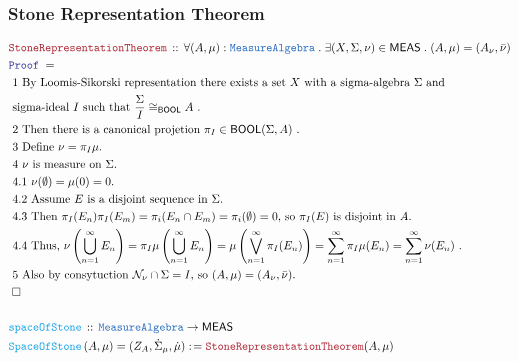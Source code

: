 \documentclass[12pt]{scrartcl}
\newcommand{\TYPE}[1]{\textcolor{NavyBlue}{\mathtt{#1}}}
\newcommand{\FUNC}[1]{\textcolor{Cerulean}{\mathtt{#1}}}
\newcommand{\LOGIC}[1]{\textcolor{Blue}{\mathtt{#1}}}
\newcommand{\THM}[1]{\textcolor{Maroon}{\mathtt{#1}}}
\renewcommand{\.}{\; . \;}
\newcommand{\de}{: \kern 0.1pc =}
\newcommand{\Act}[1]{\left( #1 \right)}
\newcommand{\Theorem}[2]{& \THM{#1} \, :: \, #2 \\ & \Proof = \\ }
\newcommand{\DeclareFunc}[2]{& \FUNC{#1} \, :: \, #2 \\}
\newcommand{\DefineNamedFunc}[4]{&  \FUNC{#1}\Act{#2} = #3 \de #4 \\}
\newcommand{\Page}[1]{ \begin{align*} #1 \end{align*}   }
\newcommand{\QED}{\; \square}
\newcommand{\EndProof}{& \QED \\}
\newcommand{\Proof}{\LOGIC{Proof} \; }
\newcommand{\Explain}[1]{& \text{#1.} \\}
\newcommand{\ExplainFurther}[1]{& \text{#1} \\}
\newcommand{\BOOL}{\mathsf{BOOL}}
\newcommand{\Null}{\mathcal{N}}
\newcommand{\MEAS}{\mathsf{MEAS}}
\newcommand{\MA}{\TYPE{MeasureAlgebra}}
\begin{document}
\subsubsection{Stone Representation Theorem}
\Page{
	\Theorem{StoneRepresentationTheorem}
	{
		\forall (A,\mu) : \MA \. \exists (X,\Sigma,\nu) \in \MEAS \. (A,\mu) = (A_\nu,\bar \nu)
	}
	\ExplainFurther{
		1 By Loomis-Sikorski representation there exists a set $X$ with a sigma-algebra $\Sigma$ and}
	\Explain{ 	sigma-ideal $I$ such that $\frac{\Sigma}{I} \cong_\BOOL  A$
	}
	\Explain{ 2
		Then there is a canonical projetion $\pi_I \in \BOOL(\Sigma,A)$	
	}
	\Explain{ 3 Define $\nu = \pi_I \mu$}
	\Explain{ 4 $\nu$ is measure on $\Sigma$}
	\Explain{ 4.1 $\nu(\emptyset) = \mu(0) = 0$}
	\Explain{ 4.2 Assume $E$ is a disjoint sequence in $\Sigma$}
	\Explain{ 4.3 Then $\pi_I(E_n)\pi_I(E_m) = \pi_i(E_n \cap E_m) = \pi_i(\emptyset) =  0$,
	 so $\pi_I(E)$ is disjoint in $A$}
	\Explain{ 4.4 Thus, 
		$\nu\left( \bigcup^\infty_{n=1} E_n \right) = 
		\pi_I\mu\left( \bigcup^\infty_{n=1} E_n \right) =  
		\mu\left( \bigvee^\infty_{n=1} \pi_I(E_n)\right) =
		\sum^\infty_{n=1} \pi_I\mu(E_n) = 
		\sum^\infty_{n=1} \nu(E_n) $ }
	\Explain{ 5 Also by consytuction $ \Null_\nu \cap \Sigma = I$, so $ (A,\mu) = (A_\nu,\bar \nu)$} 
	\EndProof
	\\
	\DeclareFunc{spaceOfStone}{\MA \to \MEAS}
	\DefineNamedFunc{SpaceOfStone}{A,\mu}{(Z_A,\dot \Sigma_\mu,\dot \mu)}
	{
			\THM{StoneRepresentationTheorem}(A,\mu)	
	}
}
\newpage
\end{document}
